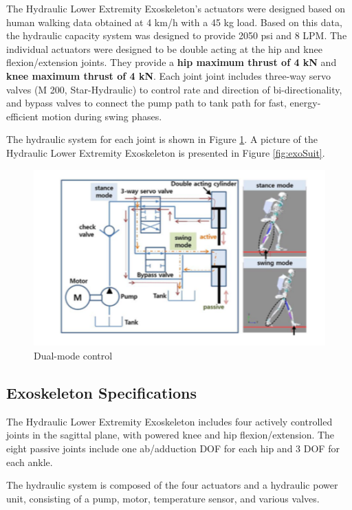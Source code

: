 \begin{refsection}
The Hydraulic Lower Extremity Exoskeleton's actuators were designed based on human walking data obtained at 4 km/h with a 45 kg load.  Based on this data, the hydraulic capacity system was designed to provide 2050 psi and 8 LPM.  The individual actuators were designed to be double acting at the hip and knee flexion/extension joints. They provide a {\bf hip maximum thrust of 4 kN} and {\bf knee maximum thrust of 4 kN}.  Each joint joint includes three-way servo valves (M 200, Star-Hydraulic) to control rate and direction of bi-directionality, and bypass valves to connect the pump path to tank path for fast, energy-efficient motion during swing phases.   

The hydraulic system for each joint is shown in Figure \ref{fig:hydraulicSys}.
A picture of the Hydraulic Lower Extremity Exoskeleton is presented in Figure \ref{fig:exoSuit}.
\begin{figure}[thpb]
\centering
\includegraphics[width=3.in]{exos/figs/hydLowerExrem/hydraulicSys}
  \caption{Dual-mode control}
 \label{fig:hydraulicSys}   
 \end{figure} 


 

 
 \subsection{Exoskeleton Specifications}
 
 The Hydraulic Lower Extremity Exoskeleton includes four actively controlled joints in the sagittal plane, with powered knee and hip flexion/extension.  The eight passive joints include one ab/adduction DOF for each hip and 3 DOF for each ankle.
 
 The hydraulic system is composed of the four actuators and a hydraulic power unit, consisting of a pump, motor, temperature sensor, and various valves.
 

\end{refsection}

